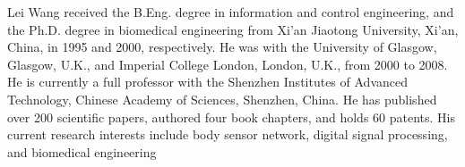 \documentclass[journal]{IEEEtran}
\begin{document}
\begin{IEEEbiographynophoto}{Lei Wang}
received the B.Eng. degree in information and control engineering, and the Ph.D. degree in biomedical engineering from Xi’an Jiaotong University, Xi’an, China, in 1995 and 2000, respectively. He was with the University of Glasgow, Glasgow, U.K., and Imperial College London, London, U.K., from 2000 to 2008. He is currently a full professor with the Shenzhen Institutes of Advanced Technology, Chinese Academy of Sciences, Shenzhen, China. He has published over 200 scientific papers, authored four book chapters, and holds 60 patents. His current research interests include body sensor network, digital signal processing, and biomedical engineering
\end{IEEEbiographynophoto}








\end{document}

